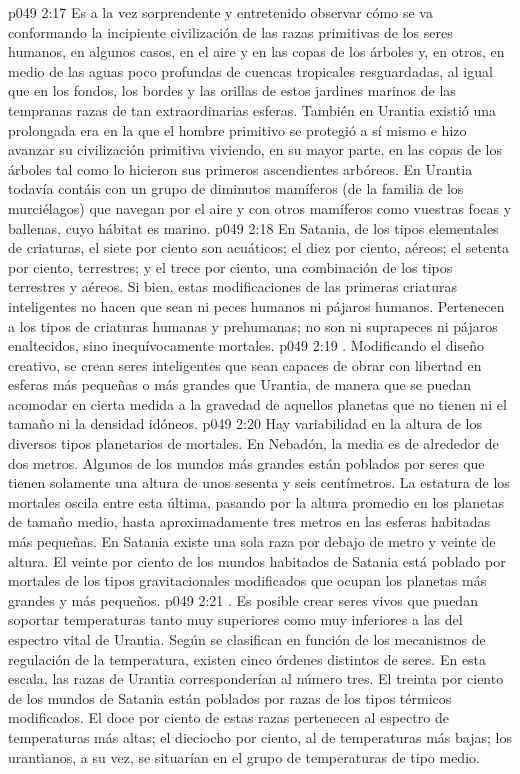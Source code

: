 \vs p049 2:17 Es a la vez sorprendente y entretenido observar cómo se va conformando la incipiente civilización de las razas primitivas de los seres humanos, en algunos casos, en el aire y en las copas de los árboles y, en otros, en medio de las aguas poco profundas de cuencas tropicales resguardadas, al igual que en los fondos, los bordes y las orillas de estos jardines marinos de las tempranas razas de tan extraordinarias esferas. También en Urantia existió una prolongada era en la que el hombre primitivo se protegió a sí mismo e hizo avanzar su civilización primitiva viviendo, en su mayor parte, en las copas de los árboles tal como lo hicieron sus primeros ascendientes arbóreos. En Urantia todavía contáis con un grupo de diminutos mamíferos (de la familia de los murciélagos) que navegan por el aire y con otros mamíferos como vuestras focas y ballenas, cuyo hábitat es marino.
\vs p049 2:18 En Satania, de los tipos elementales de criaturas, el siete por ciento son acuáticos; el diez por ciento, aéreos; el setenta por ciento, terrestres; y el trece por ciento, una combinación de los tipos terrestres y aéreos. Si bien, estas modificaciones de las primeras criaturas inteligentes no hacen que sean ni peces humanos ni pájaros humanos. Pertenecen a los tipos de criaturas humanas y prehumanas; no son ni suprapeces ni pájaros enaltecidos, sino inequívocamente mortales.
\vs p049 2:19 . Modificando el diseño creativo, se crean seres inteligentes que sean capaces de obrar con libertad en esferas más pequeñas o más grandes que Urantia, de manera que se puedan acomodar en cierta medida a la gravedad de aquellos planetas que no tienen ni el tamaño ni la densidad idóneos.
\vs p049 2:20 Hay variabilidad en la altura de los diversos tipos planetarios de mortales. En Nebadón, la media es de alrededor de dos metros. Algunos de los mundos más grandes están poblados por seres que tienen solamente una altura de unos sesenta y seis centímetros. La estatura de los mortales oscila entre esta última, pasando por la altura promedio en los planetas de tamaño medio, hasta aproximadamente tres metros en las esferas habitadas más pequeñas. En Satania existe una sola raza por debajo de metro y veinte de altura. El veinte por ciento de los mundos habitados de Satania está poblado por mortales de los tipos gravitacionales modificados que ocupan los planetas más grandes y más pequeños.
\vs p049 2:21 . Es posible crear seres vivos que puedan soportar temperaturas tanto muy superiores como muy inferiores a las del espectro vital de Urantia. Según se clasifican en función de los mecanismos de regulación de la temperatura, existen cinco órdenes distintos de seres. En esta escala, las razas de Urantia corresponderían al número tres. El treinta por ciento de los mundos de Satania están poblados por razas de los tipos térmicos modificados. El doce por ciento de estas razas pertenecen al espectro de temperaturas más altas; el dieciocho por ciento, al de temperaturas más bajas; los urantianos, a su vez, se situarían en el grupo de temperaturas de tipo medio.
